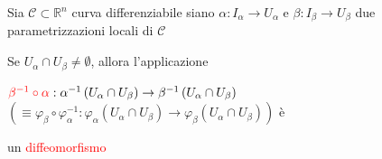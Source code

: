         \newpage
        \begin{proposizione}
        \label{prop:funzione_di_transizione_curve}
        Sia $\mathcal{C} \subset \mathbb{R}^n$ curva differenziabile siano $\alpha: I_\alpha \to U_\alpha$ e $\beta: I_\beta \to U_\beta$ due parametrizzazioni 
        locali di $\mathcal{C}$ 
        
        Se $U_\alpha \cap U_\beta \neq \emptyset$, allora l'applicazione 
        
        $\textcolor{red}{\beta^{-1} \circ \alpha}: \alpha^{-1} \left(U_\alpha \cap U_\beta \right) \to \beta^{-1} \left(U_\alpha \cap U_\beta \right)$ 
        \textcolor{blu}{$\left(\equiv  \varphi_\beta \circ \varphi_\alpha^{-1} : \varphi_{\alpha} \left(U_\alpha \cap U_\beta \right) \to \varphi_\beta \left(U_\alpha \cap U_\beta \right) \right)$} è 
        
        un \textcolor{red}{diffeomorfismo}
        \end{proposizione}
